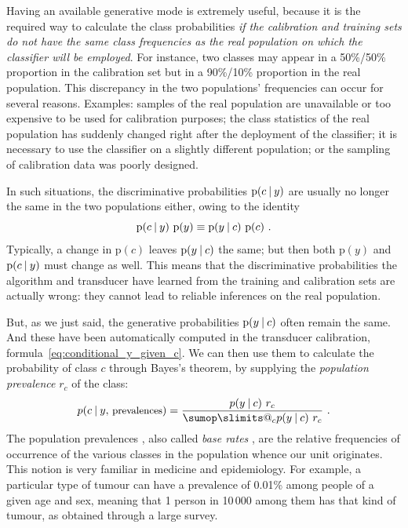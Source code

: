 \documentclass[a4paper,12pt,%
onecolumn,oneside,article,%
british%
]{memoir}
\makeatletter
\def\sum{\DOTSI\sumop\slimits@}
\newcommand*{\p}{\mathrm{p}}%
\renewcommand*{\|}[1][]{\nonscript\:#1\vert\nonscript\:\mathopen{}}
\newcommand*{\sect}{\S}%
\newcommand*{\chap}{ch.}%
\newcommand*{\texts}[1]{\text{\small #1}}
\newcommand*{\br}{r}
\makeatother
\begin{document}
Having an available generative mode is extremely useful, because it is the required way to calculate the class probabilities \emph{if the calibration and training sets do not have the same class frequencies as the real population on which the classifier will be employed}. For instance, two classes may appear in a 50\%/50\% proportion in the calibration set but in a 90\%/10\% proportion in the real population. This discrepancy in the two populations' frequencies can occur for several reasons. Examples: samples of the real population are unavailable or too expensive to be used for calibration purposes; the class statistics of the real population has suddenly changed right after the deployment of the classifier; it is necessary to use the classifier on a slightly different population; or the sampling of calibration data was poorly designed.

In such situations, the discriminative probabilities $\p(c \| y)$ are usually no longer the same in the two populations either, owing to the identity
\begin{equation}
  \label{eq:identity_conditionals}
  \p(c \| y)\ \p(y) \equiv \p(y \| c)\ \p(c) \ .
\end{equation}
Typically, a change in $\p(c)$ leaves $\p(y \| c)$ the same; but then both $\p(y)$ and $\p(c \| y)$ must change as well. This means that the discriminative probabilities the algorithm and transducer have learned from the training and calibration sets are actually wrong: they cannot lead to reliable inferences on the real population.

But, as we just said, the generative probabilities $\p(y \| c)$ often remain the same. And these have been automatically computed in the transducer calibration, formula~\eqref{eq:conditional_y_given_c}.
We can then use them to calculate the probability of class $c$ through Bayes's theorem, by supplying the \emph{population prevalence} $\br_{c}$ of the class:
\begin{equation}
  \label{eq:bayes_baserate}
  p(c \| y,\, \texts{prevalences}) = \frac{p(y \| c)\ \br_{c}}{ \sum_{c} p(y \| c)\ \br_{c} } \ .
\end{equation}
The population prevalences \autocites[\chap~3]{soxetal1988_r2013}[\sect~5.1]{huninketal2001_r2014}, also called \emph{base rates} \autocites{barhillel1980,axelsson2000}, are the relative frequencies of occurrence of the various classes in the population whence our unit originates. This notion is very familiar in medicine and epidemiology. For example, a particular type of tumour can have a prevalence of 0.01\% among people of a given age and sex, meaning that 1 person in 10\,000 among them has that kind of tumour, as obtained through a large survey.
\end{document}
